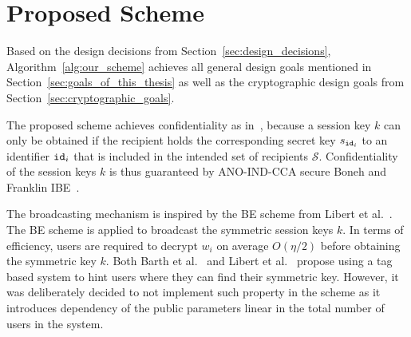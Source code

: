 





\section{Proposed Scheme}
\label{sec:proposed_scheme}
Based on the design decisions from Section~\ref{sec:design_decisions}, Algorithm~\ref{alg:our_scheme} achieves all general design goals mentioned in Section~\ref{sec:goals_of_this_thesis} as well as the cryptographic design goals from Section~\ref{sec:cryptographic_goals}.

The proposed scheme achieves confidentiality as in~\cite{art:BonehF01,art:LibertPQ12}, because a session key $k$ can only be obtained if the recipient holds the corresponding secret key $s_{\mathtt{id}_{i}}$ to an identifier $\mathtt{id}_{i}$ that is included in the intended set of recipients $\mathcal{S}$. Confidentiality of the session keys $k$ is thus guaranteed by ANO-IND-CCA secure Boneh and Franklin IBE~\cite{art:BonehF01}. 

The broadcasting mechanism is inspired by the BE scheme from Libert et al.~\cite{art:LibertPQ12}. The BE scheme is applied to broadcast the symmetric session keys $k$. In terms of efficiency, users are required to decrypt $w_i$ on average $O\left( \eta /2 \right)$ before obtaining the symmetric key $k$. Both Barth et al.~\cite{art:BarthBW06} and Libert et al.~\cite{art:LibertPQ12} propose using a tag based system to hint users where they can find their symmetric key. However, it was deliberately decided to not implement such property in the scheme as it introduces dependency of the public parameters linear in the total number of users in the system.

